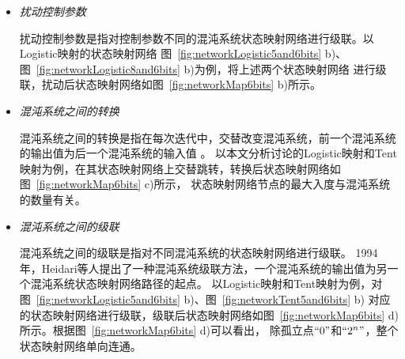 \begin{itemize}
\begin{figure*}[!htb]
\centering
\begin{minipage}{\BigTwoImW}
\centering
\texttt{[image: state\_perturbation]}
a)
\end{minipage}\hspace{\figsep}
\begin{minipage}{0.97\BigTwoImW}
\centering
\texttt{[image: u\_perturbation\_sort]}
b)
\end{minipage}\vspace{\figsep}
\begin{minipage}{\BigTwoImW}
\centering
\texttt{[image: DWSCS\_sort]}
c)
\end{minipage}\hspace{\figsep}
\begin{minipage}{0.965\BigTwoImW}
\centering
\texttt{[image: cascade\_LT]}
d)
\end{minipage}
\caption{对图~\ref{fig:networkLogistic5and6bits} b)对应SMN进行增强：
a) 扰动状态； b) 扰动控制参数； c) Logistic映射和Tent映射之间的转换； d) Logistic映射和Tent映射之间的级联}
\label{fig:networkMap6bits}
\end{figure*}

\item \textit{扰动控制参数}

扰动控制参数是指对控制参数不同的混沌系统状态映射网络进行级联\cite[Sec. 4]{vcernak1996digital}。以Logistic映射的状态映射网络
图~\ref{fig:networkLogistic5and6bits} b)、图~\ref{fig:networkLogistic8and6bits} b)为例，将上述两个状态映射网络
进行级联，扰动后状态映射网络如图~\ref{fig:networkMap6bits} b)所示。

\item \textit{混沌系统之间的转换}

混沌系统之间的转换是指在每次迭代中，交替改变混沌系统，前一个混沌系统的输出值为后一个混沌系统的输入值
。
以本文分析讨论的Logistic映射和Tent映射为例，在其状态映射网络上交替跳转，转换后状态映射网络如图~\ref{fig:networkMap6bits} c)所示，
状态映射网络节点的最大入度与混沌系统的数量有关。

\item \textit{混沌系统之间的级联}

混沌系统之间的级联是指对不同混沌系统的状态映射网络进行级联。
1994年，Heidari等人提出了一种混沌系统级联方法，一个混沌系统的输出值为另一个混沌系统状态映射网络路径的起点。
以Logistic映射和Tent映射为例，对图~\ref{fig:networkLogistic5and6bits} b)、图~\ref{fig:networkTent5and6bits} b)
对应的状态映射网络进行级联，级联后状态映射网络如图~\ref{fig:networkMap6bits} d)所示。根据图~\ref{fig:networkMap6bits} d)可以看出，
除孤立点$``0"$和$``2^n"$，整个状态映射网络单向连通。

\end{itemize}

